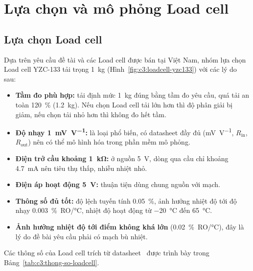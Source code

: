 \section{Lựa chọn và mô phỏng Load cell}
\label{sec:c3:loadcell}

\subsection{Lựa chọn Load cell}
\label{sec:c3:chon-loadcell}

Dựa trên yêu cầu đề tài và các Load cell được bán tại Việt Nam, nhóm lựa chọn Load cell YZC-133 tải
trọng \qty{1}{\kilo\gram} (Hình~\ref{fig:c3:loadcell-yzc133}) với các lý do sau:
\begin{itemize}
    \item \textbf{Tầm đo phù hợp:} tải định mức \qty{1}{\kilo\gram} đúng bằng tầm đo yêu cầu, quá tải an
          toàn \qty{120}{\percent} (\qty{1.2}{\kilo\gram}). Nếu chọn Load cell tải lớn hơn thì độ phân giải
          bị giảm, nếu chọn tải nhỏ hơn thì không đo hết tầm.
    \item \textbf{Độ nhạy \qty{1}{\milli\volt\per\volt}:} là loại phổ biến, có datasheet đầy đủ
          (\unit{\milli\volt\per\volt}, $R_{\mathrm{in}}$, $R_{\mathrm{out}}$) nên có thể mô hình hóa trong
          phần mềm mô phỏng.
    \item \textbf{Điện trở cầu khoảng \qty{1}{\kilo\ohm}:} ở nguồn \qty{5}{\volt}, dòng qua cầu chỉ khoảng
          \qty{4.7}{\milli\ampere} nên tiêu thụ thấp, nhiễu nhiệt nhỏ.
    \item \textbf{Điện áp hoạt động \qty{5}{\volt}:} thuận tiện dùng chung nguồn với mạch.
    \item \textbf{Thông số đủ tốt:} độ lệch tuyến tính \qty{0.05}{\percent}, ảnh hưởng nhiệt độ tới độ nhạy
          \qty{0.003}{\percent}~RO/\unit{\celsius}, nhiệt độ hoạt động từ \qty{-20}{\celsius} đến \qty{65}{\celsius}.
    \item \textbf{Ảnh hưởng nhiệt độ tới điểm không khá lớn} (\qty{0.02}{\percent}~RO/\unit{\celsius}), đây là
          lý do đề bài yêu cầu phải có mạch bù nhiệt.
\end{itemize}


Các thông số của Load cell trích từ datasheet~\cite{c3_yzc133} được trình bày trong
Bảng~\ref{tab:c3:thong-so-loadcell}.

